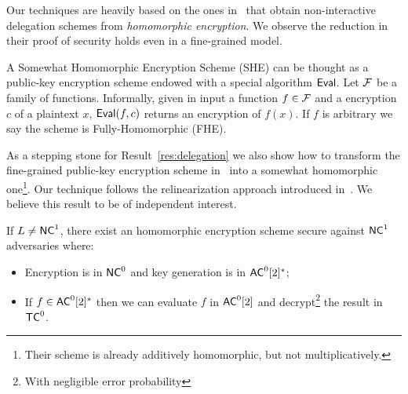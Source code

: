 Our techniques are heavily based on the ones in~\cite{ckv10} that obtain non-interactive delegation schemes from \textit{homomorphic encryption}. We observe the reduction in their proof of security holds even in a fine-grained model.

A Somewhat Homomorphic Encryption Scheme (SHE) can be thought as a public-key encryption scheme endowed with a special algorithm $\mathsf{Eval}$. Let $\cal{F}$ be a family of functions. Informally, given in input a function $f \in \cal{F}$ and a encryption $c$ of a plaintext $x$, $\mathsf{Eval}(f, c)$ returns an encryption of $f(x)$. If $f$ is arbitrary we say the scheme is Fully-Homomorphic (FHE).

As a stepping stone  for Result~\ref{res:delegation} we  also show how to transform the fine-grained public-key encryption scheme in~\cite{fgcrypto} into a somewhat homomorphic one\footnote{Their scheme is already additively homomorphic, but not multiplicatively.}. Our technique follows the relinearization approach introduced in~\cite{fhe-lwe}. We believe this result to be of independent interest.

\begin{result}
	If $L \not = {\mathsf{NC}}^1$, there exist an homomorphic encryption scheme secure against ${\mathsf{NC}}^1$ adversaries where:
	\begin{itemize}
		\item Encryption is in ${\mathsf{NC}}^0$ and key generation is in ${\mathsf{AC}}^0[2]^*$;
		\item If $f \in {\ensuremath{\mathsf{AC}}}^0[2]^*$ then we can evaluate $f$ in ${\mathsf{AC}}^0[2]$ and decrypt\footnote{With negligible error probability} the result in ${\mathsf{TC}}^0$.
	\end{itemize}
\end{result}

